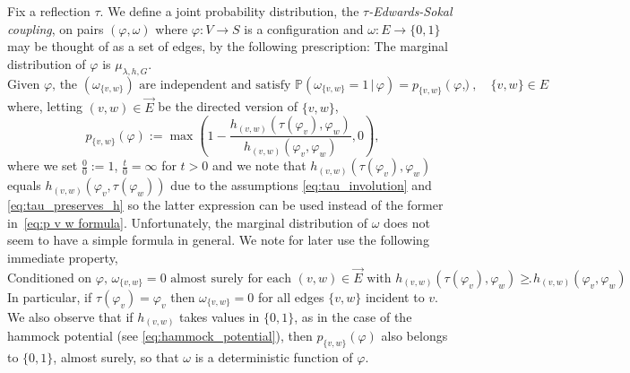\documentclass[english]{article}
\theoremstyle{plain}
\theoremstyle{plain}
\begin{document}
Fix a reflection $\tau$. We define a joint probability distribution,
the \emph{$\tau$-Edwards-Sokal coupling}, on pairs $(\varphi,
\omega)$ where $\varphi:V\to S$ is a configuration and
$\omega:E\to\{0,1\}$ may be thought of as a set of edges, by the
following prescription: The marginal distribution of $\varphi$ is
$\mu_{\lambda, h, G}$.
\begin{equation}\label{eq:omega_given_varphi}
  \text{Given $\varphi$, the $(\omega_{\{v,w\}})$ are
independent and satisfy $\mathbb{P}(\omega_{\{v,w\}} =
1\,|\,\varphi) =
  p_{\{v,w\}}(\varphi),\quad\{v,w\}\in E$},
\end{equation}
where, letting $(v,w)\in\vec{E}$ be the directed version of $\{v,w\}$,
\begin{equation}\label{eq:p v w formula}
  p_{\{v,w\}}(\varphi) := \max\left(1 -
  \frac{h_{(v,w)}(\tau(\varphi_v),
  \varphi_w)}{h_{(v,w)}(\varphi_v, \varphi_w)}, 0\right),
\end{equation}
where we set $\frac{0}{0}:=1$, $\frac{t}{0}=\infty$ for $t>0$ and we
note that $h_{(v,w)}(\tau(\varphi_v), \varphi_w)$ equals $h_{(v,w)}(\varphi_v, \tau(\varphi_w))$ due to the
assumptions \eqref{eq:tau_involution} and
\eqref{eq:tau_preserves_h} so the latter expression can be used instead of the former in~\eqref{eq:p v w formula}. Unfortunately, the marginal distribution
of $\omega$ does not seem to have a simple formula in general. We
note for later use the following immediate property,
\begin{equation}
  \text{Conditioned on $\varphi$, $\omega_{\{v,w\}} = 0$ almost surely for each $(v,w)\in\vec{E}$ with $h_{(v,w)}(\tau(\varphi_v),
  \varphi_w)\ge h_{(v,w)}(\varphi_v, \varphi_w)$}.
\end{equation}
In particular, if $\tau(\varphi_v) = \varphi_v$ then
$\omega_{\{v,w\}} = 0$ for all edges $\{v,w\}$ incident to $v$. We
also observe that if $h_{(v,w)}$ takes values in $\{0,1\}$, as
in the case of the hammock potential (see \eqref{eq:hammock_potential}), then
$p_{\{v,w\}}(\varphi)$ also belongs to $\{0,1\}$, almost surely, so
that $\omega$ is a deterministic function of $\varphi$.
\end{document}
